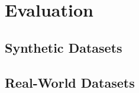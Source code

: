 \chapter{Evaluation}%
\label{sec:eval}

\section{Synthetic Datasets}%
\label{sec:eval:synthetic}

\section{Real-World Datasets}%
\label{sec:eval:real}
